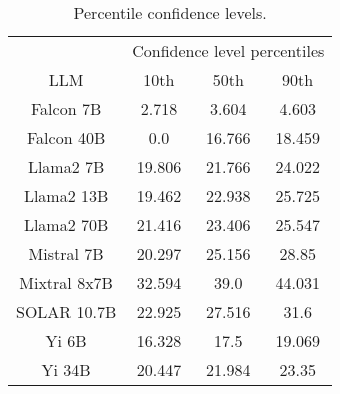 \begin{table*}
\centering
\begin{tabular}{c|c|c|c}
& \multicolumn{3}{c}{Confidence level percentiles} \\ 
LLM & 10th & 50th & 90th\\ \hline
Falcon 7B & 2.718 & 3.604 & 4.603\\
Falcon 40B & 0.0 & 16.766 & 18.459\\
Llama2 7B & 19.806 & 21.766 & 24.022\\
Llama2 13B & 19.462 & 22.938 & 25.725\\
Llama2 70B & 21.416 & 23.406 & 25.547\\
Mistral 7B & 20.297 & 25.156 & 28.85\\
Mixtral 8x7B & 32.594 & 39.0 & 44.031\\
SOLAR 10.7B & 22.925 & 27.516 & 31.6\\
Yi 6B & 16.328 & 17.5 & 19.069\\
Yi 34B & 20.447 & 21.984 & 23.35\\
\hline
\end{tabular}
\caption{Percentile confidence levels.}
\label{tab:percentile_conf}
\end{table*}
